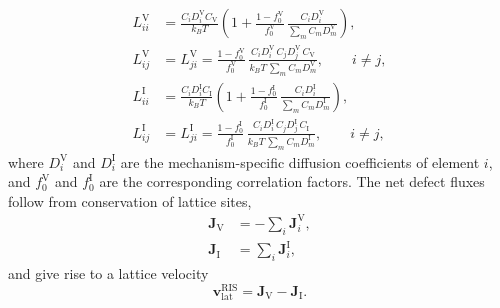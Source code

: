 \documentclass[3p,times,nonatbib]{elsarticle} %
\newcommand{\Vac}{\mathrm{V}}          %
\newcommand{\Int}{\mathrm{I}}          %
\newcommand{\lat}{\mathrm{lat}}
\begin{document}
\begin{align}
L_{ii}^{\Vac} &= \frac{C_iD_i^{\Vac}C_{\Vac}}{k_BT}
  \left(1+\frac{1-f_0^{\Vac}}{f_0^{\Vac}}\,
  \frac{C_iD_i^{\Vac}}{\sum_m C_mD_m^{\Vac}}\right),
\label{eq:onsager-vac-diag}\\
L_{ij}^{\Vac} &= L_{ji}^{\Vac}
  = \frac{1-f_0^{\Vac}}{f_0^{\Vac}}\,
    \frac{C_iD_i^{\Vac}\,C_jD_j^{\Vac}\,C_{\Vac}}
         {k_BT\,\sum_m C_mD_m^{\Vac}},
    \qquad i\neq j,
\label{eq:onsager-vac-off}\\
L_{ii}^{\Int} &= \frac{C_iD_i^{\Int}C_{\Int}}{k_BT}
  \left(1+\frac{1-f_0^{\Int}}{f_0^{\Int}}\,
  \frac{C_iD_i^{\Int}}{\sum_m C_mD_m^{\Int}}\right),
\label{eq:onsager-int-diag}\\
L_{ij}^{\Int} &= L_{ji}^{\Int}
  = \frac{1-f_0^{\Int}}{f_0^{\Int}}\,
    \frac{C_iD_i^{\Int}\,C_jD_j^{\Int}\,C_{\Int}}
         {k_BT\,\sum_m C_mD_m^{\Int}},
    \qquad i\neq j,
\label{eq:onsager-int-off}
\end{align}
where \(D_i^{\Vac}\) and \(D_i^{\Int}\) are the mechanism-specific diffusion
coefficients of element \(i\), and \(f_0^{\Vac}\) and \(f_0^{\Int}\) are the
corresponding correlation factors. The net defect fluxes follow from conservation of
lattice sites,
\begin{align}
\mathbf{J}_{\Vac} &= -\sum_i \mathbf{J}_i^{\Vac},
\label{eq:netflux-vac}\\
\mathbf{J}_{\Int} &= \sum_i \mathbf{J}_i^{\Int},
\label{eq:netflux-int}
\end{align}
and give rise to a lattice velocity
\begin{equation}
\mathbf{v}_{\lat}^{\mathrm{RIS}}=\mathbf{J}_{\Vac}-\mathbf{J}_{\Int} .
\label{eq:vlat-ris}
\end{equation}
\end{document}

